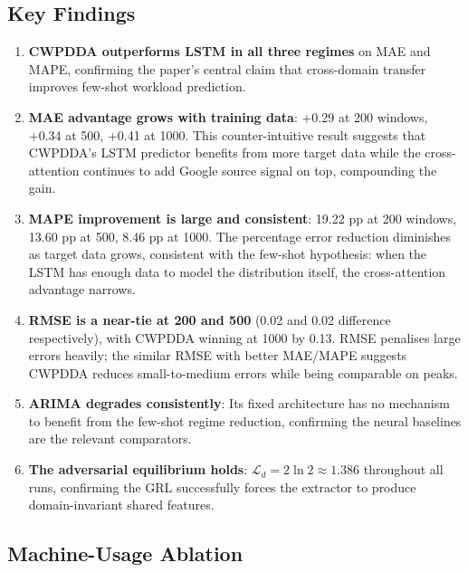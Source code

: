 \documentclass[12pt,a4paper]{article}
\begin{document}
\subsection{Key Findings}

\begin{enumerate}
    \item \textbf{CWPDDA outperforms LSTM in all three regimes} on MAE and MAPE,
    confirming the paper's central claim that cross-domain transfer improves
    few-shot workload prediction.

    \item \textbf{MAE advantage grows with training data}: +0.29 at 200 windows,
    +0.34 at 500, +0.41 at 1000.  This counter-intuitive result suggests that
    CWPDDA's LSTM predictor benefits from more target data while the cross-attention
    continues to add Google source signal on top, compounding the gain.

    \item \textbf{MAPE improvement is large and consistent}: 19.22 pp at 200 windows,
    13.60 pp at 500, 8.46 pp at 1000.  The percentage error reduction diminishes
    as target data grows, consistent with the few-shot hypothesis: when the LSTM
    has enough data to model the distribution itself, the cross-attention advantage
    narrows.

    \item \textbf{RMSE is a near-tie at 200 and 500} (0.02 and 0.02 difference
    respectively), with CWPDDA winning at 1000 by 0.13.  RMSE penalises large
    errors heavily; the similar RMSE with better MAE/MAPE suggests CWPDDA
    reduces small-to-medium errors while being comparable on peaks.

    \item \textbf{ARIMA degrades consistently}: Its fixed architecture has no
    mechanism to benefit from the few-shot regime reduction, confirming the
    neural baselines are the relevant comparators.

    \item \textbf{The adversarial equilibrium holds}: $\mathcal{L}_d = 2\ln 2 \approx 1.386$
    throughout all runs, confirming the GRL successfully forces the extractor to
    produce domain-invariant shared features.
\end{enumerate}

\subsection{Machine-Usage Ablation}
\end{document}
